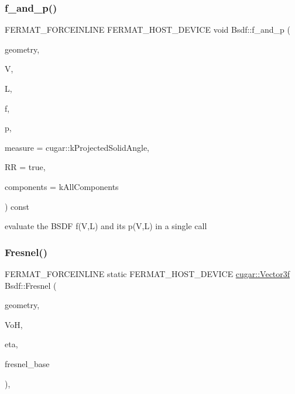 \subsubsection{\texorpdfstring{f\+\_\+and\+\_\+p()}{f\_and\_p()}\hspace{0.1cm}{\footnotesize\ttfamily [2/2]}}
{\footnotesize\ttfamily F\+E\+R\+M\+A\+T\+\_\+\+F\+O\+R\+C\+E\+I\+N\+L\+I\+NE F\+E\+R\+M\+A\+T\+\_\+\+H\+O\+S\+T\+\_\+\+D\+E\+V\+I\+CE void Bsdf\+::f\+\_\+and\+\_\+p (\begin{DoxyParamCaption}\item[{const \hyperlink{structcugar_1_1_differential_geometry}{cugar\+::\+Differential\+Geometry} \&}]{geometry,  }\item[{const \hyperlink{structcugar_1_1_vector}{cugar\+::\+Vector3f}}]{V,  }\item[{const \hyperlink{structcugar_1_1_vector}{cugar\+::\+Vector3f}}]{L,  }\item[{\hyperlink{structcugar_1_1_vector}{cugar\+::\+Vector3f} \&}]{f,  }\item[{float \&}]{p,  }\item[{const cugar\+::\+Spherical\+Measure}]{measure = {\ttfamily cugar\+:\+:kProjectedSolidAngle},  }\item[{const bool}]{RR = {\ttfamily true},  }\item[{const \hyperlink{struct_bsdf_a5f7db6f81220ed9ee6da109d6eb5b585}{Component\+Type}}]{components = {\ttfamily kAllComponents} }\end{DoxyParamCaption}) const\hspace{0.3cm}{\ttfamily [inline]}}

evaluate the B\+S\+DF f(\+V,\+L) and its p(\+V,\+L) in a single call \mbox{\label{struct_bsdf_aa35356849fd5563fe53584fa45ca3714}} 
\subsubsection{\texorpdfstring{Fresnel()}{Fresnel()}}
{\footnotesize\ttfamily F\+E\+R\+M\+A\+T\+\_\+\+F\+O\+R\+C\+E\+I\+N\+L\+I\+NE static F\+E\+R\+M\+A\+T\+\_\+\+H\+O\+S\+T\+\_\+\+D\+E\+V\+I\+CE \hyperlink{structcugar_1_1_vector}{cugar\+::\+Vector3f} Bsdf\+::\+Fresnel (\begin{DoxyParamCaption}\item[{const \hyperlink{structcugar_1_1_differential_geometry}{cugar\+::\+Differential\+Geometry} \&}]{geometry,  }\item[{const float}]{VoH,  }\item[{const float}]{eta,  }\item[{const \hyperlink{structcugar_1_1_vector}{cugar\+::\+Vector3f}}]{fresnel\+\_\+base }\end{DoxyParamCaption})\hspace{0.3cm}{\ttfamily [inline]}, {\ttfamily [static]}}

